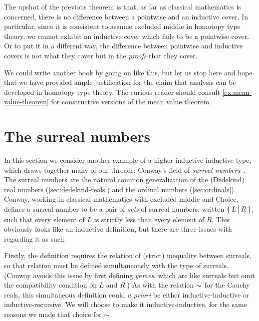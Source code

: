 The upshot of the previous theorem is that, as far as classical mathematics is concerned,
there is no difference between a pointwise and an inductive cover. In particular, since it
is consistent to assume excluded middle in homotopy type theory, we cannot exhibit an
inductive cover which fails to be a pointwise cover. Or to put it in a different way, the
difference between pointwise and inductive covers is not what they cover but in the
\emph{proofs} that they cover. 

We could write another book by going on like this, but let us stop here and hope that we
have provided ample justification for the claim that analysis can be developed in homotopy
type theory. The curious reader should consult \autoref{ex:mean-value-theorem} for
constructive versions of the mean value theorem.



\section{The surreal numbers}
\label{sec:surreals}


In this section we consider another example of a higher inductive-in\-duc\-tive type, which draws together many of our threads: Conway's field \NO of \emph{surreal numbers}~\cite{conway:onag}.
The surreal numbers are the natural common generalization of the (Dedekind) real numbers (\autoref{sec:dedekind-reals}) and the ordinal numbers (\autoref{sec:ordinals}).
Conway, working in classical mathematics with excluded middle and Choice, defines a surreal number to be a pair of \emph{sets} of surreal numbers, written $\{\,L\,\big|\,R\,\}$, such that every element of $L$ is strictly less than every element of $R$.
This obviously looks like an inductive definition, but there are three issues with regarding it as such.

Firstly, the definition requires the relation of (strict) inequality between surreals, so that relation must be defined simultaneously with the type \NO of surreals.
(Conway avoids this issue by first defining \emph{games}, which are like surreals but omit the compatibility condition on $L$ and $R$.)
As with the relation $\mathord\sim$ for the Cauchy reals, this simultaneous definition could \emph{a priori} be either inductive-inductive or inductive-recursive.
We will choose to make it inductive-inductive, for the same reasons we made that choice for $\mathord\sim$.

